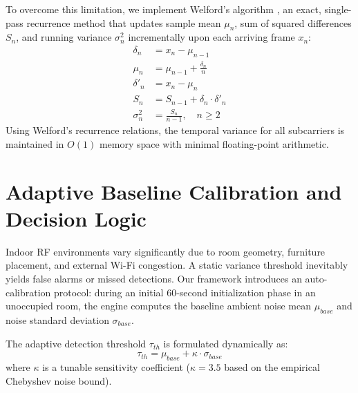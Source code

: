 To overcome this limitation, we implement Welford's algorithm \cite{welford1962note}, an exact, single-pass recurrence method that updates sample mean $\mu_n$, sum of squared differences $S_n$, and running variance $\sigma_n^2$ incrementally upon each arriving frame $x_n$:
\begin{align}
\delta_n &= x_n - \mu_{n-1} \label{eq:welford1} \\
\mu_n &= \mu_{n-1} + \frac{\delta_n}{n} \label{eq:welford2} \\
\delta'_n &= x_n - \mu_n \label{eq:welford3} \\
S_n &= S_{n-1} + \delta_n \cdot \delta'_n \label{eq:welford4} \\
\sigma_n^2 &= \frac{S_n}{n - 1}, \quad n \ge 2 \label{eq:welford5}
\end{align}
Using Welford's recurrence relations, the temporal variance for all subcarriers is maintained in $O(1)$ memory space with minimal floating-point arithmetic.

\section{Adaptive Baseline Calibration and Decision Logic}
Indoor RF environments vary significantly due to room geometry, furniture placement, and external Wi-Fi congestion. A static variance threshold inevitably yields false alarms or missed detections. Our framework introduces an auto-calibration protocol: during an initial 60-second initialization phase in an unoccupied room, the engine computes the baseline ambient noise mean $\mu_{base}$ and noise standard deviation $\sigma_{base}$.

The adaptive detection threshold $\tau_{th}$ is formulated dynamically as:
\begin{equation}
\tau_{th} = \mu_{base} + \kappa \cdot \sigma_{base}
\label{eq:dynamic_thresh}
\end{equation}
where $\kappa$ is a tunable sensitivity coefficient ($\kappa = 3.5$ based on the empirical Chebyshev noise bound).

